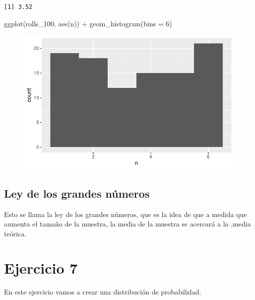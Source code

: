 \documentclass[
  letterpaper,
  DIV=11,
  numbers=noendperiod]{scrreprt}
\newenvironment{Shaded}{\begin{snugshade}}{\end{snugshade}}
\newcommand{\AttributeTok}[1]{\textcolor[rgb]{0.40,0.45,0.13}{#1}}
\newcommand{\DecValTok}[1]{\textcolor[rgb]{0.68,0.00,0.00}{#1}}
\newcommand{\FunctionTok}[1]{\textcolor[rgb]{0.28,0.35,0.67}{#1}}
\newcommand{\NormalTok}[1]{\textcolor[rgb]{0.00,0.23,0.31}{#1}}
\newcommand{\SpecialCharTok}[1]{\textcolor[rgb]{0.37,0.37,0.37}{#1}}
\begin{document}
\begin{verbatim}
[1] 3.52
\end{verbatim}

\begin{Shaded}
\begin{Highlighting}[]
\FunctionTok{ggplot}\NormalTok{(rolls\_100, }\FunctionTok{aes}\NormalTok{(n)) }\SpecialCharTok{+} 
  \FunctionTok{geom\_histogram}\NormalTok{(}\AttributeTok{bins =} \DecValTok{6}\NormalTok{)}
\end{Highlighting}
\end{Shaded}

\begin{figure}[H]

{\centering \includegraphics{summary_files/figure-pdf/unnamed-chunk-14-1.pdf}

}

\end{figure}

\hypertarget{ley-de-los-grandes-nuxfameros}{%
\subsection{Ley de los grandes
números}\label{ley-de-los-grandes-nuxfameros}}

Esto se llama la ley de los grandes números, que es la idea de que a
medida que aumenta el tamaño de la muestra, la media de la muestra se
acercará a la ,media teórica.

\hypertarget{ejercicio-7}{%
\section{Ejercicio 7}\label{ejercicio-7}}

En este ejercicio vamos a crear una distribución de probabilidad.
\end{document}

